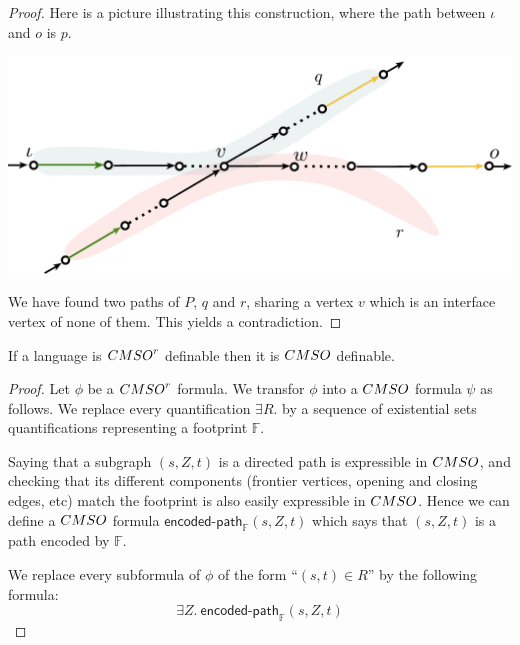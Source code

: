 \begin{proof}
Here is a picture illustrating this construction, where the path between $\iota$ and $o$ is $p$.
\begin{center}
\includegraphics[scale=.3]{Pictures/proof-encoding-paths}
\end{center}
We have found two paths of $P$, $q$ and $r$, sharing a vertex $v$ which is an interface vertex of none of them. This yields a contradiction. 
\end{proof}

\begin{theorem}
If a language is $\CMSO^r$ definable then it is $\CMSO$ definable.
\end{theorem}

\begin{proof}
Let $\phi$ be a $\CMSO^r$ formula. We transfor $\phi$ into a $\CMSO$ formula $\psi$ as follows. We replace every quantification $\exists R.$ by a sequence of existential sets quantifications representing  a footprint $\mathbb{F}$. 

Saying that a subgraph $(s,Z,t)$ is a directed path is expressible in $\CMSO$, and checking that its different components (frontier vertices, opening and closing edges, etc) match the footprint is also easily expressible in $\CMSO$. Hence we can define a  $\CMSO$ formula $\mathsf{encoded\text{-}path}_\mathbb{F}(s,Z,t)$ which says that $(s,Z,t)$ is a path encoded by $\mathbb{F}$. 

We replace every  subformula of $\phi$ of the form ``$(s,t)\in R$'' by the following formula: $$\exists Z.\ \mathsf{encoded\text{-}path}_\mathbb{F}(s,Z,t)$$
\end{proof}
